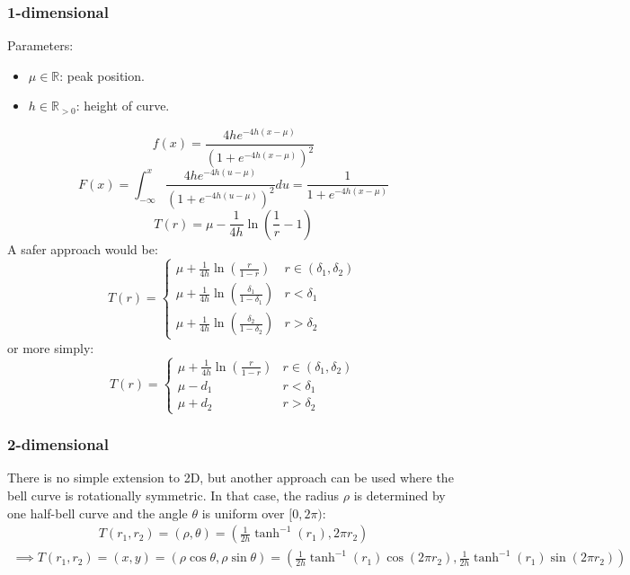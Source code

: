 \documentclass[10pt]{report}
\begin{document}
\subsubsection{1-dimensional}
Parameters:
\begin{itemize}
\item $\mu\in\mathbb{R}$: peak position.
\item $h\in\mathbb{R}_{>0}$: height of curve.
\end{itemize}
\begin{equation}f(x)=\frac{4he^{-4h(x-\mu)}}{(1+e^{-4h(x-\mu)})^2}\end{equation}
\begin{equation}F(x)=\int_{-\infty}^x\frac{4he^{-4h(u-\mu)}}{(1+e^{-4h(u-\mu)})^2}du=\frac{1}{1+e^{-4h(x-\mu)}}\end{equation}
\begin{equation}T(r)=\mu-\frac{1}{4h}\ln\left(\frac{1}{r}-1\right)\end{equation}
A safer approach would be:
\begin{equation}T(r)=\begin{cases}
\mu+\frac{1}{4h}\ln\left(\frac{r}{1-r}\right)&r\in(\delta_1,\delta_2)\\
\mu+\frac{1}{4h}\ln\left(\frac{\delta_1}{1-\delta_1}\right)&r<\delta_1\\
\mu+\frac{1}{4h}\ln\left(\frac{\delta_2}{1-\delta_2}\right)&r>\delta_2
\end{cases}\end{equation}
or more simply:
\begin{equation}T(r)=\begin{cases}
\mu+\frac{1}{4h}\ln\left(\frac{r}{1-r}\right)&r\in(\delta_1,\delta_2)\\
\mu-d_1&r<\delta_1\\
\mu+d_2&r>\delta_2
\end{cases}\end{equation}
\subsubsection{2-dimensional}
There is no simple extension to 2D, but another approach can be used where the bell curve is rotationally symmetric. In that case, the radius $\rho$ is determined by one half-bell curve and the angle $\theta$ is uniform over $[0,2\pi)$:
\begin{eqnarray}T(r_1,r_2)=(\rho,\theta)=(\tfrac{1}{2h}\tanh^{-1}(r_1),2\pi r_2)\end{eqnarray}
\begin{eqnarray}\implies T(r_1,r_2)=(x,y)=(\rho\cos\theta,\rho\sin\theta)=\left(\tfrac{1}{2h}\tanh^{-1}(r_1)\cos(2\pi r_2),\tfrac{1}{2h}\tanh^{-1}(r_1)\sin(2\pi r_2)\right)\end{eqnarray}
\end{document}
